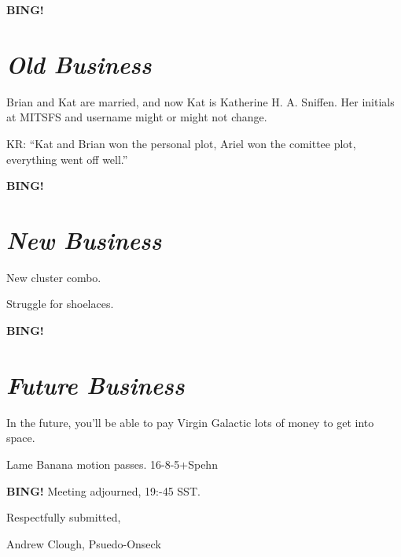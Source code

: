 \documentclass[10pt]{article}
\newcommand{\bing}{{\bf BING!} }
\newcommand{\goto}[1]{\bing \vskip 12pt \section*{{\em{#1}}}}
\begin{document}


\goto{Old Business}

Brian and Kat are married, and now Kat is Katherine H. A. Sniffen.  Her initials at MITSFS and username might or might not change.

KR:  ``Kat and Brian won the personal plot, Ariel won the comittee plot, everything went off well.''

\goto{New Business}

New cluster combo.

Struggle for shoelaces.

\goto{Future Business}

In the future, you'll be able to pay Virgin Galactic lots of money to get into space.

Lame Banana motion passes.  16-8-5+Spehn

\bing
\noindent
Meeting adjourned, 19:-45 SST.

\vspace{18pt}

\centerline{Respectfully submitted,}
\centerline{Andrew Clough, Psuedo-Onseck}
\end{document}
